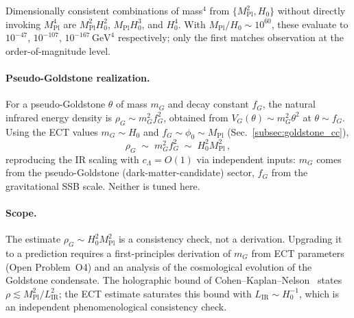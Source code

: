 Dimensionally consistent combinations of mass$^4$ from
$\{M_{\mathrm{Pl}}^2, H_0\}$ without directly invoking
$M_{\mathrm{Pl}}^4$ are $M_{\mathrm{Pl}}^2 H_0^2$, $M_{\mathrm{Pl}}
H_0^3$, and $H_0^4$. With $M_{\mathrm{Pl}}/H_0 \sim 10^{60}$, these
evaluate to $10^{-47}$, $10^{-107}$, $10^{-167}\,\mathrm{GeV}^4$
respectively; only the first matches observation at the
order-of-magnitude level.

\paragraph{Pseudo-Goldstone realization.} For a pseudo-Goldstone
$\theta$ of mass $m_G$ and decay constant $f_G$, the natural infrared
energy density is $\rho_G \sim m_G^2 f_G^2$, obtained from
$V_G(\theta) \sim m_G^2\theta^2$ at $\theta \sim f_G$. Using the ECT
values $m_G \sim H_0$ and $f_G \sim \phi_0 \sim M_{\mathrm{Pl}}$
(Sec.~\ref{subsec:goldstone_cc}),
\begin{equation}
\rho_G \;\sim\; m_G^2 f_G^2 \;\sim\; H_0^2 M_{\mathrm{Pl}}^2\,,
\end{equation}
reproducing the IR scaling with $c_\Lambda = O(1)$ via independent
inputs: $m_G$ comes from the pseudo-Goldstone (dark-matter-candidate)
sector, $f_G$ from the gravitational SSB scale. Neither is tuned
here.

\paragraph{Scope.} The estimate $\rho_G \sim H_0^2 M_{\mathrm{Pl}}^2$
is a consistency check, not a derivation. Upgrading it to a
prediction requires a first-principles derivation of $m_G$ from ECT
parameters (Open Problem~O4) and an analysis of the cosmological
evolution of the Goldstone condensate. The holographic bound of
Cohen--Kaplan--Nelson~\cite{CohenKaplanNelson1999} states
$\rho \lesssim M_{\mathrm{Pl}}^2/L_{\mathrm{IR}}^2$; the ECT estimate
saturates this bound with $L_{\mathrm{IR}}\sim H_0^{-1}$, which is an
independent phenomenological consistency check.

